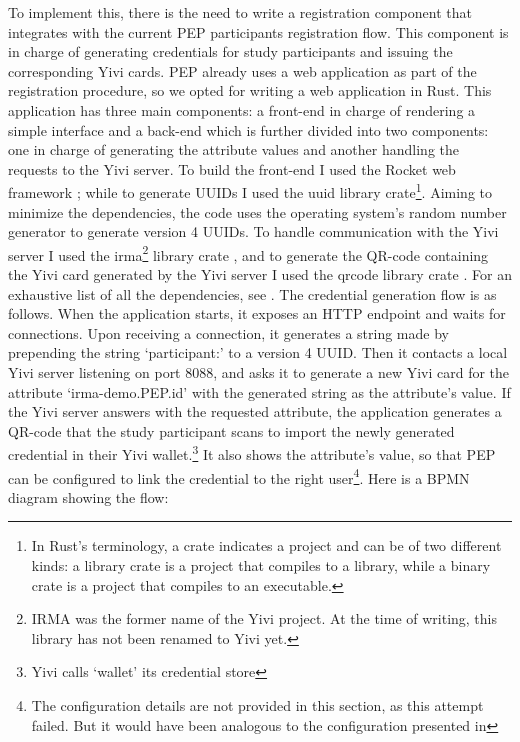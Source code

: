 \documentclass{report}
\begin{document}
To implement this, there is the need to write a registration component that integrates with the current PEP participants registration flow. This component is in charge of
generating credentials for study participants and issuing the corresponding Yivi cards. PEP already uses a web application as part of the registration procedure, so we opted for
writing a web application in Rust. This application has three main components: a front-end in charge of rendering a simple interface and a back-end which is further divided into
two components: one in charge of generating the attribute values and another handling the requests to the Yivi server. To build the front-end I used the Rocket web framework
\cite{rocket}; while to generate UUIDs I used the uuid \cite{uuid_crate} library crate\footnote{In Rust's terminology, a crate indicates a project and can be of two different kinds:
a library crate is a project that compiles to a library, while a binary crate is a project that compiles to an executable.}. Aiming to minimize the dependencies, the code uses the
operating system's random number generator to generate version 4 UUIDs. To handle communication with the Yivi server I used the irma\footnote{IRMA was the former name of the Yivi
project. At the time of writing, this library has not been renamed to Yivi yet.} library crate \cite{irma_crate}, and to generate the QR-code containing the Yivi card generated by
the Yivi server I used the qrcode library crate \cite{qrcode_crate}. For an exhaustive list of all the dependencies, see \cite{registration_poc_cargo_toml}.  The credential
generation flow is as follows. When the application starts, it exposes an HTTP endpoint and waits for connections. Upon receiving a connection, it generates a string made by
prepending the string \enquote*{participant:} to a version 4 UUID. Then it contacts a local Yivi server listening on port 8088, and asks it to generate a new Yivi card for the
attribute \enquote*{irma-demo.PEP.id} with the generated string as the attribute's value. If the Yivi server answers with the requested attribute, the application generates a
QR-code that the study participant scans to import the newly generated credential in their Yivi wallet.\footnote{Yivi calls \enquote*{wallet} its credential store} It also shows the attribute's value, so that PEP can
be configured to link the credential to the right user\footnote{The configuration details are not provided in this section, as this attempt failed. But it would have been analogous
to the configuration presented in}. Here is a BPMN diagram showing the flow:
\end{document}
